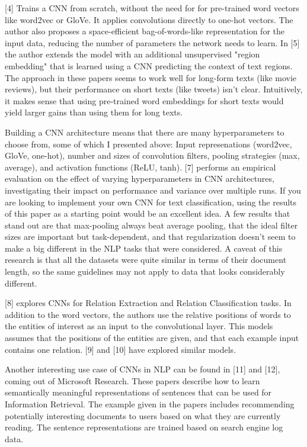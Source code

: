 \documentclass[10pt,a4paper]{ctexbook}
\begin{document}
[4] Trains a CNN from scratch, without the need for for pre-trained word vectors like word2vec or GloVe. It applies convolutions directly to one-hot vectors. The author also proposes a space-efficient bag-of-words-like representation for the input data, reducing the number of parameters the network needs to learn. In [5] the author extends the model with an additional unsupervised "region embedding" that is learned using a CNN predicting the context of text regions. The approach in these papers seems to work well for long-form texts (like movie reviews), but their performance on short texts (like tweets) isn't clear. Intuitively, it makes sense that using pre-trained word embeddings for short texts would yield larger gains than using them for long texts.

Building a CNN architecture means that there are many hyperparameters to choose from, some of which I presented above: Input represenations (word2vec, GloVe, one-hot), number and sizes of convolution filters, pooling strategies (max, average), and activation functions (ReLU, tanh). [7] performs an empirical evaluation on the effect of varying hyperparameters in CNN architectures, investigating their impact on performance and variance over multiple runs. If you are looking to implement your own CNN for text classification, using the results of this paper as a starting point would be an excellent idea. A few results that stand out are that max-pooling always beat average pooling, that the ideal filter sizes are important but task-dependent, and that regularization doesn't seem to make a big different in the NLP tasks that were considered. A caveat of this research is that all the datasets were quite similar in terms of their document length, so the same guidelines may not apply to data that looks considerably different.

[8] explores CNNs for Relation Extraction and Relation Classification tasks. In addition to the word vectors, the authors use the relative positions of words to the entities of interest as an input to the convolutional layer. This models assumes that the positions of the entities are given, and that each example input contains one relation. [9] and [10] have explored similar models.

Another interesting use case of CNNs in NLP can be found in [11] and [12], coming out of Microsoft Research. These papers describe how to learn semantically meaningful representations of sentences that can be used for Information Retrieval. The example given in the papers includes recommending potentially interesting documents to users based on what they are currently reading. The sentence representations are trained based on search engine log data.
\end{document}
